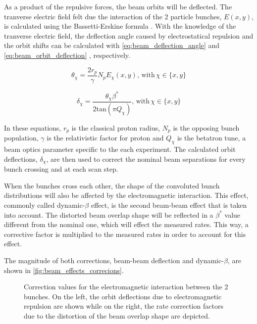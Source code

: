 As a product of the repulsive forces, the beam orbits will be deflected. The tranverse electric field felt due the interaction of the 2 particle bunches, $E(x, y)$, is calculated using the Bassetti-Erskine formula \cite{Bassetti:122227}. With the knowledge of the tranverse electric field, the deflection angle caused by electrostatical repulsion and the orbit shifts can be calculated with \autoref{eq:beam_deflection_angle} and \autoref{eq:beam_orbit_deflection} \cite{PhysRevLett.62.2949}, respectively.

\begin{equation}
	\theta_{\chi} = \frac{2r_p}{\gamma} N_p E_{\chi}(x, y), \, \mathrm{with} \, \chi \in \{ x, y \}
	\label{eq:beam_deflection_angle}
\end{equation}

\begin{equation}
	\delta_{\chi} = \frac{\theta_{\chi} \beta^{*}}{2 \mathrm{tan} \left( \pi Q_{\chi} \right)}, \, \mathrm{with} \, \chi \in \{ x, y \}
	\label{eq:beam_orbit_deflection}
\end{equation}

In these equations, $r_p$ is the classical proton radius, $N_p$ is the opposing bunch population, $\gamma$ is the relativistic factor for proton and $Q_{\chi}$ is the betatron tune, a beam optics parameter specific to the each experiment. The calculated orbit deflections, $\delta_{\chi}$, are then used to correct the nominal beam separations for every bunch crossing and at each scan step.

When the bunches cross each other, the shape of the convoluted bunch distributions will also be affected by the electromagnetic interaction. This effect, commonly called dynamic-$\beta$ effect, is the second beam-beam effect that is taken into account. The distorted beam overlap shape will be reflected in a $\beta^{*}$ value different from the nominal one, which will effect the measured rates. This way, a corrective factor is multiplied to the measured rates in order to account for this effect.

The magnitude of both corrections, beam-beam deflection and dynamic-$\beta$, are shown in \autoref{fig:beam_effects_correcions}.

\begin{figure}[!htb]
	\centering
	\caption[Electromagnetic interaction correction]{Correction values for the electromagnetic interaction between the 2 bunches. On the left, the orbit deflections due to electromagnetic repulsion are shown while on the right, the rate correction factors due to the distortion of the beam overlap shape are depicted.}
	\label{fig:beam_effects_correcions}
\end{figure}


